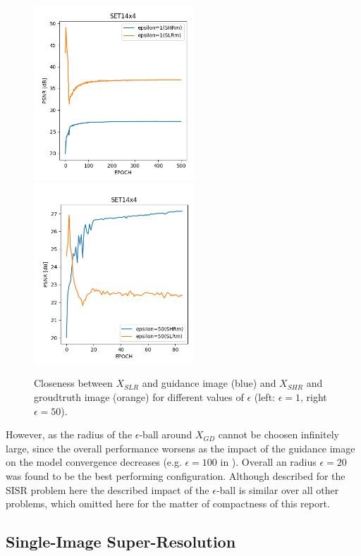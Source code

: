 \begin{figure}[!htbp]
	\centering
	\includegraphics[width=6cm]{figures/epsball_loss_1_set14}
  \includegraphics[width=6cm]{figures/epsball_loss_50_set14}
	\caption{Closeness between $X_{SLR}$ and guidance image (blue) and $X_{SHR}$
  and groudtruth image (orange) for different values of $\epsilon$ (left:
  $\epsilon = 1$, right $\epsilon = 50$).}
  \label{fig:epsball_loss}
\end{figure}

However, as  the radius of the $\epsilon$-ball
around $X_{GD}$ cannot be choosen infinitely large, since the overall performance
worsens as the impact of the guidance image on the model convergence decreases
(e.g. $\epsilon = 100$ in ). Overall an
radius $\epsilon = 20$ was found to be the best performing configuration.
Although described for the \ac{SISR} problem here the described impact of
the $\epsilon$-ball is similar over all other problems, which omitted here
for the matter of compactness of this report.

\subsection{Single-Image Super-Resolution}
\label{sec:Experiments_SISR}




